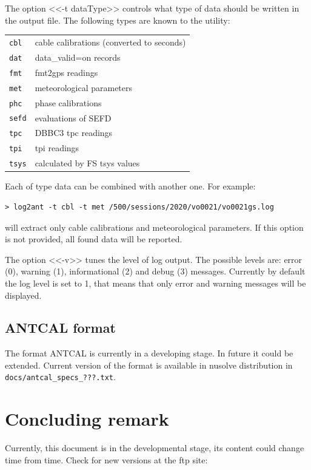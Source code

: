 \documentclass [10pt,letterpaper]{report}
\begin{document}
The option <<-t dataType>> controls what type of data should be written in the output file.
The following types are known to the utility:

\begin{tabular}{ll}
{\tt  cbl}  & cable calibrations (converted to seconds)\\
{\tt  dat}  & data\_valid=on records\\
{\tt  fmt}  & fmt2gps readings\\
{\tt  met}  & meteorological parameters\\
{\tt  phc}  & phase calibrations\\
{\tt sefd}  & evaluations of SEFD\\
{\tt  tpc}  & DBBC3 tpc readings\\
{\tt  tpi}  & tpi readings\\
{\tt tsys}  & calculated by FS tsys values\\
\end{tabular}

\noindent
Each of type data can be combined with another one. For example:

\begin{verbatim}
> log2ant -t cbl -t met /500/sessions/2020/vo0021/vo0021gs.log
\end{verbatim}

\noindent
will extract only cable calibrations and meteorological parameters. If this option is not
provided, all found data will be reported.

The option <<-v>> tunes the level of log output. The possible levels are: error (0),
warning (1), informational (2) and debug (3) messages. Currently by default the log level
is set to 1, that means that only error and warning messages will be displayed.


\section{ANTCAL format}
\label{section_antcal_format}

The format ANTCAL is currently in a developing stage. In future it could be extended.
Current version of the format is available in nusolve distribution in 
{\tt docs/antcal\_specs\_???.txt}.




%
%
\chapter{Concluding remark}
\label{chapt_concluding_remark}
Currently, this document is in the developmental stage, its content could change
time from time. Check for new versions at the ftp site:
\end{document}
